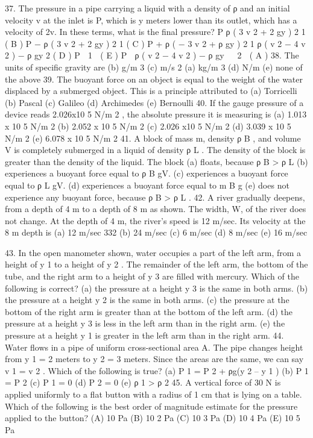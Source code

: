 37. The pressure in a pipe carrying a liquid with a density of ρ and an initial velocity v at the inlet is P, which is y
meters lower than its outlet, which has a velocity of 2v. In these terms, what is the final pressure?
P
ρ ( 3 v 2 + 2 gy )
2
1
( B ) P − ρ ( 3 v 2 + 2 gy )
2
1
( C ) P + ρ ( − 3 v 2 + ρ gy )
2
1
ρ ( v 2 − 4 v 2 ) − ρ gy
2
( D )
P
 1

( E ) P  ρ ( v 2 − 4 v 2 ) − ρ gy 
 2

( A )
38. The units of specific gravity are
(b) g/m 3
(c) m/s 2
(a) kg/m 3
(d) N/m
(e) none of the above
39. The buoyant force on an object is equal to the weight of the water displaced by a submerged object. This is a
principle attributed to
(a) Torricelli
(b) Pascal
(c) Galileo
(d) Archimedes
(e) Bernoulli
40. If the gauge pressure of a device reads 2.026x10 5 N/m 2 , the absolute pressure it is measuring is
(a) 1.013 x 10 5 N/m 2
(b) 2.052 x 10 5 N/m 2
(c) 2.026 x10 5 N/m 2
(d) 3.039 x 10 5 N/m 2
(e) 6.078 x 10 5 N/m 2
41. A block of mass m, density ρ B , and volume V is completely submerged in a liquid of density ρ L . The density of
the block is greater than the density of the liquid. The block
(a) floats, because ρ B > ρ L
(b) experiences a buoyant force equal to ρ B gV.
(c) experiences a buoyant force equal to ρ L gV.
(d) experiences a buoyant force equal to m B g
(e) does not experience any buoyant force, because ρ B > ρ L .
42. A river gradually deepens, from a depth of 4 m to a depth of 8 m as shown. The width, W, of the river does not
change. At the depth of 4 m, the river’s speed is 12 m/sec. Its velocity at the 8 m depth is
(a) 12 m/sec
332
(b) 24 m/sec
(c) 6 m/sec
(d) 8 m/sec
(e) 16 m/sec



43. In the open manometer shown, water occupies a part of the left arm, from a height of y 1 to a height of y 2 . The
remainder of the left arm, the bottom of the tube, and the right arm to a height of y 3 are filled with mercury.
Which of the following is correct?
(a) the pressure at a height y 3 is the same in both arms.
(b) the pressure at a height y 2 is the same in both arms.
(c) the pressure at the bottom of the right arm is greater than at the bottom of the left arm.
(d) the pressure at a height y 3 is less in the left arm than in the right arm.
(e) the pressure at a height y 1 is greater in the left arm than in the right arm.
44. Water flows in a pipe of uniform cross-sectional area A.
The pipe changes height from y 1 = 2 meters to y 2 = 3 meters. Since the areas are the same, we can say v 1 = v 2 .
Which of the following is true?
(a) P 1 = P 2 + ρg(y 2 – y 1 )
(b) P 1 = P 2
(c) P 1 = 0
(d) P 2 = 0
(e) ρ 1 > ρ 2
45. A vertical force of 30 N is applied uniformly to a flat button with a radius of 1 cm that is lying on a table. Which
of the following is the best order of magnitude estimate for the pressure applied to the button?
(A) 10 Pa
(B) 10 2 Pa
(C) 10 3 Pa
(D) 10 4 Pa
(E) 10 5 Pa




